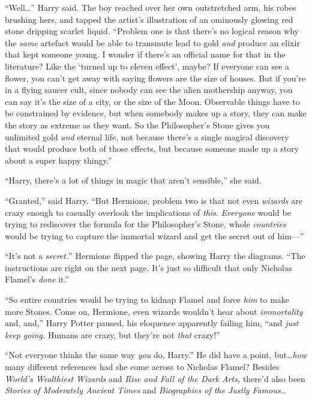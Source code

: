 “Well…” Harry said. The boy reached over her own outstretched arm, his robes brushing hers, and tapped the artist’s illustration of an ominously glowing red stone dripping scarlet liquid. “Problem one is that there’s no logical reason why the \emph{same} artefact would be able to transmute lead to gold \emph{and} produce an elixir that kept someone young. I wonder if there’s an official name for that in the literature? Like the ‘turned up to eleven effect’, maybe? If everyone can see a flower, you can’t get away with saying flowers are the size of houses. But if you’re in a flying saucer cult, since nobody can see the alien mothership anyway, you can say it’s the size of a city, or the size of the Moon. Observable things have to be constrained by evidence, but when somebody makes up a story, they can make the story as extreme as they want. So the Philosopher’s Stone gives you unlimited gold \emph{and} eternal life, not because there’s a single magical discovery that would produce both of those effects, but because someone made up a story about a super happy thingy.”

“Harry, there’s a lot of things in magic that aren’t sensible,” she said.

“Granted,” said Harry. “But Hermione, problem two is that not even \emph{wizards} are crazy enough to casually overlook the implications of \emph{this}. \emph{Everyone} would be trying to rediscover the formula for the Philosopher’s Stone, whole \emph{countries} would be trying to capture the immortal wizard and get the secret out of him—”

“It’s not a \emph{secret.}” Hermione flipped the page, showing Harry the diagrams. “The instructions are right on the next page. It’s just so difficult that only Nicholas Flamel’s \emph{done} it.”

“So entire countries would be trying to kidnap Flamel and force \emph{him} to make more Stones. Come on, Hermione, even wizards wouldn’t hear about \emph{immortality} and, and,” Harry Potter paused, his eloquence apparently failing him, “and \emph{just keep going.} Humans are crazy, but they’re not \emph{that} crazy!”

“Not everyone thinks the same way \emph{you} do, Harry.” He did have a point, but…\emph{how} many different references had she come across to Nicholas Flamel? Besides \emph{World’s Wealthiest Wizards} and \emph{Rise and Fall of the Dark Arts,} there’d also been \emph{Stories of Moderately Ancient Times} and \emph{Biographies of the Justly Famous…}

